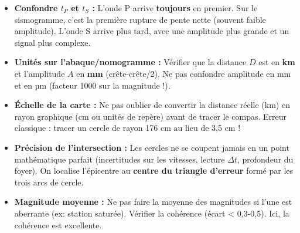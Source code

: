 \documentclass[11pt]{article}
\begin{document}
\begin{attention}
\begin{itemize}
    \item \textbf{Confondre $t_P$ et $t_S$ :} L'onde P arrive \textbf{toujours} en premier. Sur le sismogramme, c'est la première rupture de pente nette (souvent faible amplitude). L'onde S arrive plus tard, avec une amplitude plus grande et un signal plus complexe.
    \item \textbf{Unités sur l'abaque/nomogramme :} Vérifier que la distance $D$ est en \textbf{km} et l'amplitude $A$ en \textbf{mm} (crête-crête/2). Ne pas confondre amplitude en mm et en µm (facteur 1000 sur la magnitude !).
    \item \textbf{Échelle de la carte :} Ne pas oublier de convertir la distance réelle (km) en rayon graphique (cm ou unités de repère) avant de tracer le compas. Erreur classique : tracer un cercle de rayon 176 cm au lieu de 3,5 cm !
    \item \textbf{Précision de l'intersection :} Les cercles ne se coupent jamais en un point mathématique parfait (incertitudes sur les vitesses, lecture $\Delta t$, profondeur du foyer). On localise l'épicentre au \textbf{centre du triangle d'erreur} formé par les trois arcs de cercle.
    \item \textbf{Magnitude moyenne :} Ne pas faire la moyenne des magnitudes si l'une est aberrante (ex: station saturée). Vérifier la cohérence (écart < 0,3-0,5). Ici, la cohérence est excellente.
\end{itemize}
\end{attention}
\end{document}
